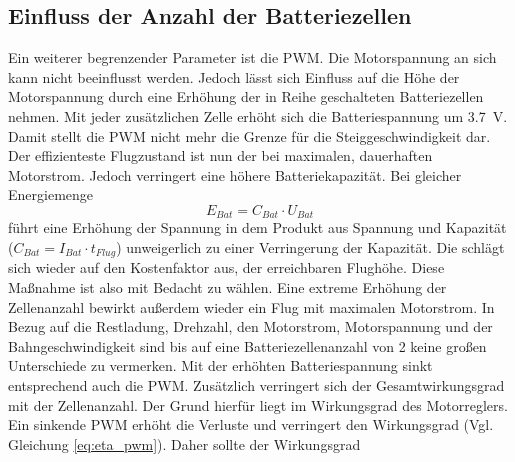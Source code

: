 \subsection{Einfluss der Anzahl der Batteriezellen}
Ein weiterer begrenzender Parameter ist die PWM. Die Motorspannung an sich kann nicht beeinflusst werden. Jedoch lässt sich Einfluss auf die Höhe der Motorspannung durch eine Erhöhung der in Reihe geschalteten Batteriezellen nehmen. Mit jeder zusätzlichen Zelle erhöht sich die Batteriespannung um \SI{3,7}{V}. Damit stellt die PWM nicht mehr die Grenze für die Steiggeschwindigkeit dar. Der effizienteste Flugzustand ist nun der bei maximalen, dauerhaften Motorstrom. Jedoch verringert eine höhere Batteriekapazität. Bei gleicher Energiemenge 
\begin{equation}
	E_{Bat} = C_{Bat}\cdot U_{Bat}
\end{equation}
führt eine Erhöhung der Spannung in dem Produkt aus Spannung und Kapazität (\ensuremath{C_{Bat} = I_{Bat}\cdot t_{Flug}}) unweigerlich zu einer Verringerung der Kapazität. Die schlägt sich wieder auf den Kostenfaktor aus, der erreichbaren Flughöhe. Diese Maßnahme ist also mit Bedacht zu wählen. Eine extreme Erhöhung der Zellenanzahl bewirkt außerdem wieder ein Flug mit maximalen Motorstrom.
In Bezug auf die Restladung, Drehzahl, den Motorstrom, Motorspannung und der Bahngeschwindigkeit sind bis auf eine Batteriezellenanzahl von 2 keine großen Unterschiede zu vermerken. Mit der erhöhten Batteriespannung sinkt entsprechend auch die PWM. Zusätzlich verringert sich der Gesamtwirkungsgrad mit der Zellenanzahl. Der Grund hierfür liegt im Wirkungsgrad des Motorreglers. Ein sinkende PWM erhöht die Verluste und verringert den Wirkungsgrad (Vgl. Gleichung \ref{eq:eta_pwm}). Daher sollte der Wirkungsgrad 

